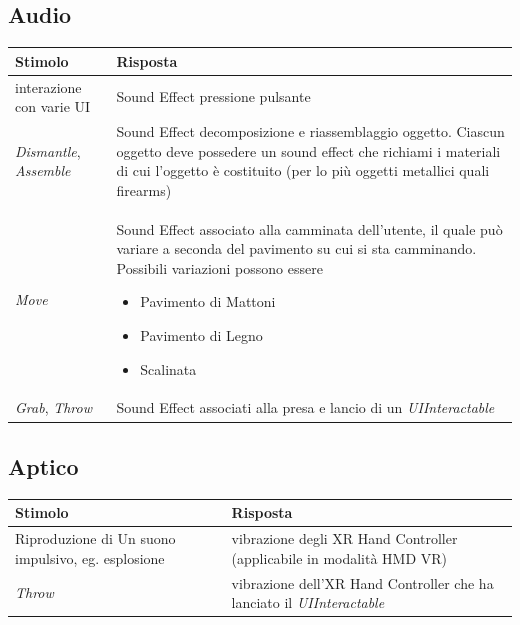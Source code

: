 \documentclass[10pt, openany]{article}
\begin{document}
    \subsection{Audio}
    \begin{table}[h]
      \centering
      \begin{tabular}{@{} p{} p{} @{}}
        \toprule
        \textbf{Stimolo} & \textbf{Risposta} \\
        \midrule
        interazione con varie UI & Sound Effect pressione pulsante \\
        \textit{Dismantle}, \textit{Assemble} & Sound Effect decomposizione e riassemblaggio oggetto. Ciascun oggetto deve possedere un sound effect che richiami i materiali di cui 
          l'oggetto \`e costituito (per lo pi\`u oggetti metallici quali firearms) \\
        \textit{Move} & Sound Effect associato alla camminata dell'utente, il quale pu\`o variare a seconda del pavimento su cui si sta camminando. Possibili variazioni possono essere
          \begin{itemize}[noitemsep, topsep=0pt]
            \item Pavimento di Mattoni
            \item Pavimento di Legno
            \item Scalinata
          \end{itemize} \\
        \textit{Grab}, \textit{Throw} & Sound Effect associati alla presa e lancio di un \textit{UIInteractable} \\
        \bottomrule
      \end{tabular}
    \end{table}
    \FloatBarrier
    \subsection{Aptico}
    \begin{table}[h]
      \centering
      \begin{tabular}{@{} p{} p{} @{}}
        \toprule
        \textbf{Stimolo} & \textbf{Risposta} \\
        \midrule
        Riproduzione di Un suono impulsivo, eg. esplosione\footnotemark{} & vibrazione degli XR Hand Controller (applicabile in modalit\`a HMD VR) \\
        \textit{Throw} & vibrazione dell'XR Hand Controller che ha lanciato il \textit{UIInteractable} \\
        \bottomrule
      \end{tabular}
    \end{table}
    \FloatBarrier
\end{document}
